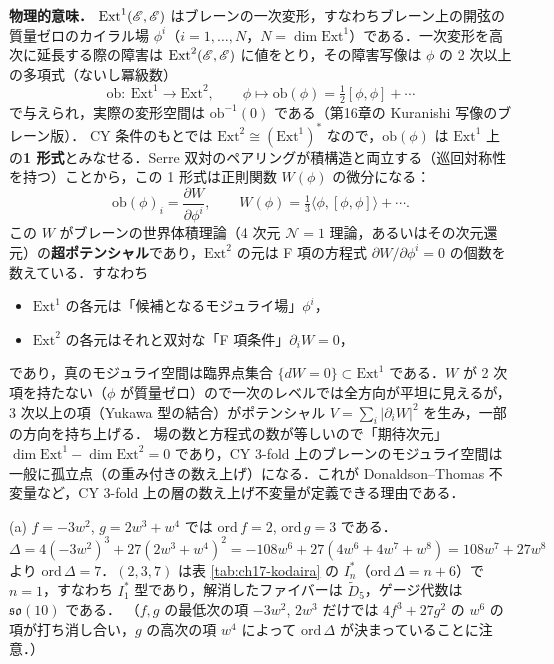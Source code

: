 \textbf{物理的意味．}
$\mathrm{Ext}^1(\mathscr{E},\mathscr{E})$ はブレーンの一次変形，すなわちブレーン上の開弦の質量ゼロのカイラル場 $\phi^i$（$i=1,\dots,N$，$N=\dim\mathrm{Ext}^1$）である．一次変形を高次に延長する際の障害は $\mathrm{Ext}^2(\mathscr{E},\mathscr{E})$ に値をとり，その障害写像は $\phi$ の 2 次以上の多項式（ないし冪級数）
\[
\mathrm{ob}:\ \mathrm{Ext}^1\to\mathrm{Ext}^2,\qquad \phi\mapsto \mathrm{ob}(\phi)=\tfrac12[\phi,\phi]+\cdots
\]
で与えられ，実際の変形空間は $\mathrm{ob}^{-1}(0)$ である（第16章の Kuranishi 写像のブレーン版）．
CY 条件のもとでは $\mathrm{Ext}^2\cong(\mathrm{Ext}^1)^*$ なので，$\mathrm{ob}(\phi)$ は $\mathrm{Ext}^1$ 上の\textbf{1 形式}とみなせる．Serre 双対のペアリングが積構造と両立する（巡回対称性を持つ）ことから，この 1 形式は正則関数 $W(\phi)$ の微分になる：
\[
\mathrm{ob}(\phi)_i=\frac{\partial W}{\partial\phi^i},\qquad W(\phi)=\tfrac13\langle\phi,[\phi,\phi]\rangle+\cdots .
\]
この $W$ がブレーンの世界体積理論（4 次元 $\mathcal{N}=1$ 理論，あるいはその次元還元）の\textbf{超ポテンシャル}であり，$\mathrm{Ext}^2$ の元は F 項の方程式 $\partial W/\partial\phi^i=0$ の個数を数えている．すなわち
\begin{itemize}
\item $\mathrm{Ext}^1$ の各元は「候補となるモジュライ場」$\phi^i$，
\item $\mathrm{Ext}^2$ の各元はそれと双対な「F 項条件」$\partial_iW=0$，
\end{itemize}
であり，真のモジュライ空間は臨界点集合 $\{dW=0\}\subset\mathrm{Ext}^1$ である．$W$ が 2 次項を持たない（$\phi$ が質量ゼロ）ので一次のレベルでは全方向が平坦に見えるが，3 次以上の項（Yukawa 型の結合）がポテンシャル $V=\sum_i|\partial_iW|^2$ を生み，一部の方向を持ち上げる．
場の数と方程式の数が等しいので「期待次元」$\dim\mathrm{Ext}^1-\dim\mathrm{Ext}^2=0$ であり，CY 3-fold 上のブレーンのモジュライ空間は一般に孤立点（の重み付きの数え上げ）になる．これが Donaldson--Thomas 不変量など，CY 3-fold 上の層の数え上げ不変量が定義できる理由である．

(a) $f=-3w^2$, $g=2w^3+w^4$ では $\mathrm{ord}\,f=2$, $\mathrm{ord}\,g=3$ である．
\[
\Delta=4(-3w^2)^3+27(2w^3+w^4)^2=-108w^6+27(4w^6+4w^7+w^8)=108w^7+27w^8
\]
より $\mathrm{ord}\,\Delta=7$．$(2,3,7)$ は表 \ref{tab:ch17-kodaira} の $I_n^*$（$\mathrm{ord}\,\Delta=n+6$）で $n=1$，すなわち $I_1^*$ 型であり，解消したファイバーは $\tilde D_5$，ゲージ代数は $\mathfrak{so}(10)$ である．
（$f,g$ の最低次の項 $-3w^2$, $2w^3$ だけでは $4f^3+27g^2$ の $w^6$ の項が打ち消し合い，$g$ の高次の項 $w^4$ によって $\mathrm{ord}\,\Delta$ が決まっていることに注意．）

